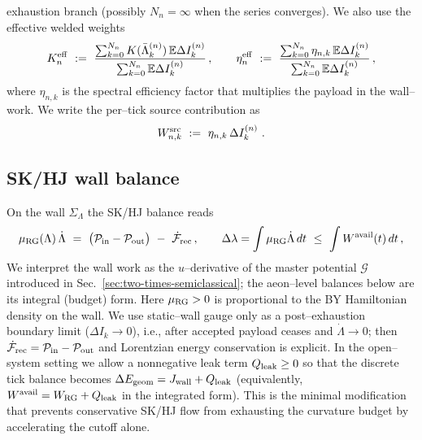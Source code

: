 \documentclass[10pt]{article}
\theoremstyle{definition}
\theoremstyle{plain}
\begin{document}
exhaustion branch (possibly $N_n=\infty$ when the series converges).
We also use the effective welded weights
\begin{equation}
K^{\rm eff}_n\ :=\ \frac{\sum_{k=0}^{N_n}K(\bar\Lambda_k^{(n)})\,\mathbb E\Delta I_k^{(n)}}{\sum_{k=0}^{N_n}\mathbb E\Delta I_k^{(n)}}\,,\qquad
\eta^{\rm eff}_n\ :=\ \frac{\sum_{k=0}^{N_n}\eta_{n,k}\,\mathbb E\Delta I_k^{(n)}}{\sum_{k=0}^{N_n}\mathbb E\Delta I_k^{(n)}}\,,
\label{eq:ads5-eff-weights}
\end{equation}
where $\eta_{n,k}$ is the spectral efficiency factor that multiplies the payload in the wall--work. We write the per--tick source contribution as
\begin{equation}
\label{eq:ads5-Wsrc}
W^{\rm src}_{n,k}\ :=\ \eta_{n,k}\,\Delta I_k^{(n)}\ .
\end{equation}

\subsection{SK/HJ wall balance}
\label{subsec:ads5-gauges}

On the wall $\Sigma_\Lambda$ the SK/HJ balance reads
\begin{equation}
\mu_{\rm RG}(\Lambda)\,\dot\Lambda\ =\ \big(\mathcal P_{\rm in}-\mathcal P_{\rm out}\big)\ -\ \dot{\mathcal F}_{\rm rec}\,,\qquad
\Delta\lambda=\int \mu_{\rm RG}\dot\Lambda\,dt\ \le\ \int W^{\rm avail}(t)\,dt\,,
\label{eq:ads5-wall-ode}
\end{equation}
We interpret the wall work as the $u$--derivative of the master potential $\mathcal G$
introduced in Sec.~\ref{sec:two-times-semiclassical}; the aeon--level balances below
are its integral (budget) form. Here $\mu_{\rm RG}>0$ is proportional to the BY Hamiltonian
density on the wall. We use static--wall gauge only as a post--exhaustion boundary limit
($\Delta I_k\to0$), i.e., after accepted payload ceases and $\dot\Lambda\to 0$; then
$\dot{\mathcal F}_{\rm rec}=\mathcal P_{\rm in}-\mathcal P_{\rm out}$ and Lorentzian
energy conservation is explicit.
In the open--system setting we allow a nonnegative leak term $Q_{\rm leak}\ge 0$ so that
the discrete tick balance becomes $\Delta E_{\rm geom}=J_{\rm wall}+Q_{\rm leak}$ (equivalently,
$W^{\rm avail}=W_{\rm RG}+Q_{\rm leak}$ in the integrated form). This is the minimal modification
that prevents conservative SK/HJ flow from exhausting the curvature budget by accelerating
the cutoff alone.
\end{document}
